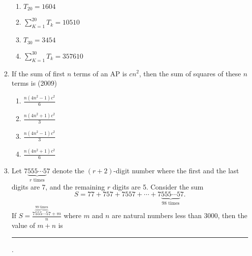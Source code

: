 \begin{enumerate}[label=\thesubsection.\arabic*,ref=\thesubsection.\theenumi]
	\hfill {}
		\begin{multicols}{2}
\begin{enumerate}
\item     $T_{20} =1604$  
\item    $\sum_{K=1}^{20}T_k=10510$
\item     $T_{30}=3454$ 
\item     $\sum_{K=1}^{30}T_k=357610$  
\end{enumerate}
                                         \end{multicols} 
\item If the sum of first $n$ terms of an AP is $cn^2$,  then the sum of squares of these $n$ terms is \hfill(2009)
%                
%            
             \begin{multicols}{4}
\begin{enumerate}    
                    \item $\frac{n(4n^2-1)c^2}{6}$
                    \item $\frac{n(4n^2+1)c^2}{3}$
                    \item $\frac{n(4n^2-1)c^2}{3}$
                    \item $\frac{n(4n^2+1)c^2}{6}$
		\end{enumerate}
         \end{multicols}
%  
\item  Let $ {7\underbrace{555\cdots5}_{r \text{ times}}7} $ denote the \( (r+2) \)-digit number where the first and the last digits are 7, and the remaining \( r \) digits are 5. Consider the sum $$S =77 + 757 + 7557 + \cdots + 7\underbrace{555\cdots5}_{98 \text{ times}}7.$$ If $ S = \frac{7\overbrace{555\cdots5}^{99 \text{ times}}7+m}{n} $ where \( m \) and \( n \) are natural numbers less than 3000, then the value of \( m + n \) is \rule{1cm}{0.1pt}.
	\hfill {}
\end{enumerate}
